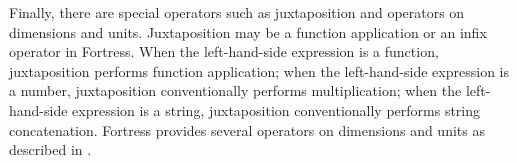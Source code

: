 Finally, there are special operators such as juxtaposition
and operators on dimensions and units.
Juxtaposition may be a function application or
an infix operator in Fortress.
When the left-hand-side expression is a function, juxtaposition performs
function application; when the left-hand-side expression is a number,
juxtaposition conventionally performs multiplication; when the
left-hand-side expression is a string,
juxtaposition conventionally performs string concatenation.
Fortress provides several operators on dimensions and units
as described in .
